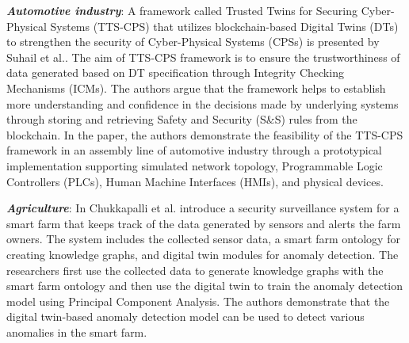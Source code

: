 \textbf{\textit{Automotive industry}}: A framework called Trusted Twins for Securing Cyber-Physical Systems (TTS-CPS) that utilizes blockchain-based Digital Twins (DTs) to strengthen the security of Cyber-Physical Systems (CPSs) is presented by Suhail et al.\cite{suhailSituationalAwareCyberphysical2022}. The aim of TTS-CPS framework is to ensure the trustworthiness of data generated based on DT specification through Integrity Checking Mechanisms (ICMs). The authors argue that the framework helps to establish more understanding and confidence in the decisions made by underlying systems through storing and retrieving Safety and Security (S\&S) rules from the blockchain. In the paper, the authors demonstrate the feasibility of the TTS-CPS framework in an assembly line of automotive industry through a prototypical implementation supporting simulated network topology, Programmable Logic Controllers (PLCs), Human Machine Interfaces (HMIs), and physical devices. 

\textbf{\textit{Agriculture}}: In\cite{chukkapalliCyberPhysicalSystemSecurity2021} Chukkapalli et al. introduce a security surveillance system for a smart farm that keeps track of the data generated by sensors and alerts the farm owners. The system includes the collected sensor data, a smart farm ontology for creating knowledge graphs, and digital twin modules for anomaly detection. The researchers first use the collected data to generate knowledge graphs with the smart farm ontology and then use the digital twin to train the anomaly detection model using Principal Component Analysis. The authors demonstrate that the digital twin-based anomaly detection model can be used to detect various anomalies in the smart farm.
